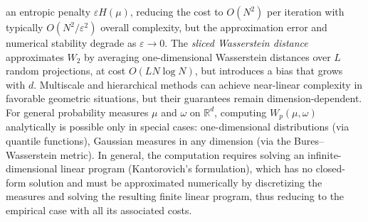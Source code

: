 \documentclass[12pt,a4paper,oneside]{amsart}
\theoremstyle{plain}
\theoremstyle{definition}
\numberwithin{equation}{section}
\numberwithin{figure}{section}
\numberwithin{table}{section}
\theoremstyle{remark}
\newcommand{\R}{\mathbb{R}}
\begin{document}
an entropic penalty $\varepsilon H(\mu)$, reducing the cost to $O(N^2)$ per
iteration with typically $O(N^2 / \varepsilon^2)$ overall complexity, but the approximation error and numerical stability degrade as
$\varepsilon \to 0$. The \emph{sliced Wasserstein distance} approximates $W_2$ by
averaging one-dimensional Wasserstein distances over $L$ random projections, at
cost $O(LN\log N)$, but introduces a bias that grows with $d$. Multiscale and
hierarchical methods can achieve near-linear complexity in favorable geometric
situations, but their guarantees remain dimension-dependent.
For general probability measures $\mu$ and $\omega$ on $\R^d$, computing $W_p(\mu,\omega)$
analytically is possible only in special cases: one-dimensional distributions (via
quantile functions), Gaussian measures in any dimension (via the Bures--Wasserstein
metric). In general, the computation requires solving
an infinite-dimensional linear program (Kantorovich's formulation), which has no
closed-form solution and must be approximated numerically by discretizing the measures
and solving the resulting finite linear program, thus reducing to the empirical case
with all its associated costs.
\\ 
\end{document}
